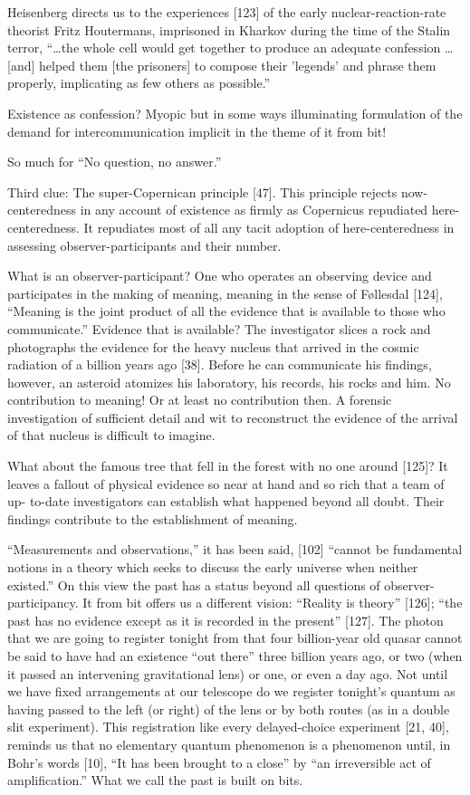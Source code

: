 \documentclass[11pt]{article}
\begin{document}
	Heisenberg directs us to the experiences [123] of the early nuclear-reaction-rate
	theorist Fritz Houtermans, imprisoned in Kharkov during the time of the Stalin
	terror, ``\ldots the whole cell would get together to produce an adequate confession
	\ldots [and] helped them [the prisoners] to compose their 'legends' and phrase them
	properly, implicating as few others as possible.''
	
	Existence as confession? Myopic but in some ways illuminating formulation of
	the demand for intercommunication implicit in the theme of it from bit!
	
	So much for ``No question, no answer.''
	
	Third clue: The super-Copernican principle [47]. This principle rejects now-
	centeredness in any account of existence as firmly as Copernicus repudiated here-
	centeredness. It repudiates most of all any tacit adoption of here-centeredness in
	assessing observer-participants and their number.
	
	What is an observer-participant? One who operates an observing device and
	participates in the making of meaning, meaning in the sense of Føllesdal [124],
	``Meaning is the joint product of all the evidence that is available to those who
	communicate.'' Evidence that is available? The investigator slices a rock and photographs the evidence for the heavy nucleus that arrived in the cosmic radiation of a
	billion years ago [38]. Before he can communicate his findings, however, an asteroid
	atomizes his laboratory, his records, his rocks and him. No contribution to meaning!
	Or at least no contribution then. A forensic investigation of sufficient detail and
	wit to reconstruct the evidence of the arrival of that nucleus is difficult to imagine.
	
	What about the famous tree that fell in the forest with no one around [125]? It
	leaves a fallout of physical evidence so near at hand and so rich that a team of up-
	to-date investigators can establish what happened beyond all doubt. Their findings
	contribute to the establishment of meaning.
	
	``Measurements and observations,'' it has been said, [102] ``cannot be fundamental notions in a theory which seeks to discuss the early universe when neither
	existed.'' On this view the past has a status beyond all questions of observer-
	participancy. It from bit offers us a different vision: ``Reality is theory'' [126]; ``the
	past has no evidence except as it is recorded in the present'' [127]. The photon that
	we are going to register tonight from that four billion-year old quasar cannot be said
	to have had an existence ``out there'' three billion years ago, or two (when it passed
	an intervening gravitational lens) or one, or even a day ago. Not until we have fixed
	arrangements at our telescope do we register tonight's quantum as having passed
	to the left (or right) of the lens or by both routes (as in a double slit experiment).
	This registration like every delayed-choice experiment [21, 40], reminds us that no
	elementary quantum phenomenon is a phenomenon until, in Bohr's words [10], ``It
	has been brought to a close'' by ``an irreversible act of amplification.'' What we call
	the past is built on bits.
	
\end{document}

